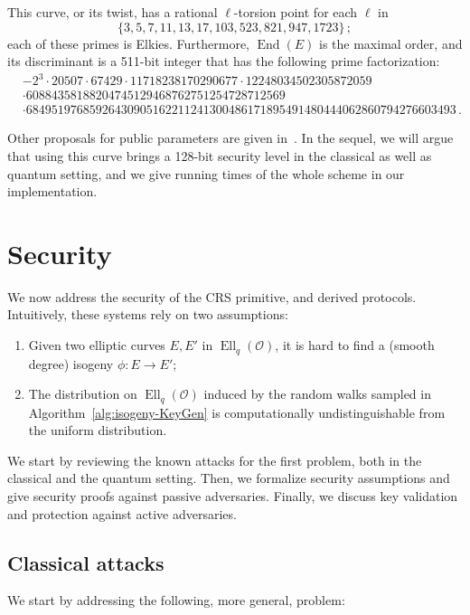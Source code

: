 \documentclass{llncs}
\renewcommand{\O}{\mathcal{O}}
\DeclareMathOperator{\End}{End}
\DeclareMathOperator{\Ell}{Ell}
\begin{document}
This curve, or its twist, has a rational $\ell$-torsion point 
for each $\ell$ in
\[
  \{3, 5, 7, 11, 13, 17, 103, 523, 821, 947, 1723\}
  \,;
\]
each of these primes is Elkies.
Furthermore, $\End(E)$ is the maximal order, and its discriminant is
a 511-bit integer that has the following prime factorization:
\[
\begin{aligned}
& \scriptstyle -2^3 \cdot 20507 \cdot 67429 \cdot 11718238170290677 \cdot 12248034502305872059 \\
& \scriptstyle \cdot 60884358188204745129468762751254728712569\\
& \scriptstyle \cdot 68495197685926430905162211241300486171895491480444062860794276603493\,.
\end{aligned}
\]

Other proposals for public parameters are given in~\cite{memoire}.
In the sequel, we will argue that using this curve brings a 128-bit security level
in the classical as well as quantum setting, and we give running times of the whole
scheme in our implementation.

\section{Security}
\label{sec:sec}

We now address the security of the CRS primitive, and derived
protocols. Intuitively, these systems rely on two assumptions:
\begin{enumerate}
\item Given two elliptic curves $E,E'$ in $\Ell_q(\O)$, it is hard to
  find a (smooth degree) isogeny $ϕ:E→E'$;
\item The distribution on $\Ell_q(\O)$ induced by the random walks
  sampled in Algorithm~\ref{alg:isogeny-KeyGen} is computationally
  undistinguishable from the uniform distribution.
\end{enumerate}

We start by reviewing the known attacks for the first problem, both in
the classical and the quantum setting. Then, we formalize security
assumptions and give security proofs against passive adversaries.
Finally, we discuss key validation and protection against active
adversaries.

\subsection{Classical attacks}
\label{sec:classical-attacks}

We start by addressing the following, more general, problem:
\end{document}
